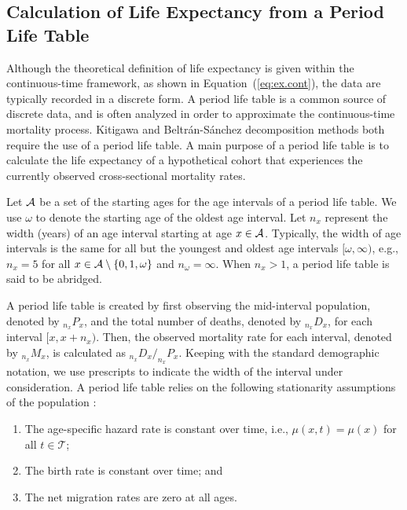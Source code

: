 \documentclass[11pt,letterpaper]{article}
\theoremstyle{plain}
\begin{document}
\subsection{Calculation of Life Expectancy from a Period Life Table}
\label{subsec:period_lifetable}
 Although the theoretical definition of life
expectancy is given within the continuous-time framework, as shown in
Equation~(\ref{eq:ex.cont}), the data are typically recorded in a
discrete form.  A period life table is a common source of discrete
data, and is often analyzed in order to approximate the
continuous-time mortality process. Kitigawa and
Beltr\'{a}n-S\'{a}nchez decomposition methods both require the use of
a period life table. A main purpose of a period life table is to
calculate the life expectancy of a hypothetical cohort that
experiences the currently observed cross-sectional mortality rates.

Let $\mathcal{A}$ be a set of the starting ages for the age intervals of a
period life table. We use $\omega$ to denote the starting age of the
oldest age interval. Let $n_x$ represent the width (years) of an age
interval starting at age $x \in \mathcal{A}$. Typically, the width of age
intervals is the same for all but the youngest and oldest age intervals $[\omega,
\infty)$, e.g., $n_x=5$ for all $x \in \mathcal{A} \setminus \{0,1,\omega\}$ and
$n_\omega=\infty$.  When $n_x>1$, a period life table is said to be
abridged.

A period life table is created by first observing the mid-interval
population, denoted by $_{n_x}P_x$, and the total number of deaths,
denoted by $_{n_x}D_x$, for each interval $[x,x+n_x)$.  Then, the
observed mortality rate for each interval, denoted by $_{n_x}M_x$, is
calculated as $_{n_x}D_x/_{n_x}P_x$.  Keeping with the standard
demographic notation, we use prescripts to indicate the width of the
interval under consideration.  A period life table relies on the
following stationarity assumptions of the population
\cite{chiang84,PreHeuGui00}:
\begin{enumerate}
\item The age-specific hazard rate is constant over
  time, i.e., $\mu(x,t)=\mu(x)$ for all $t\in\mathcal{T}$;
\item The birth rate is constant over time; and
\item The net migration rates are zero at all ages.
\end{enumerate}
\end{document}
